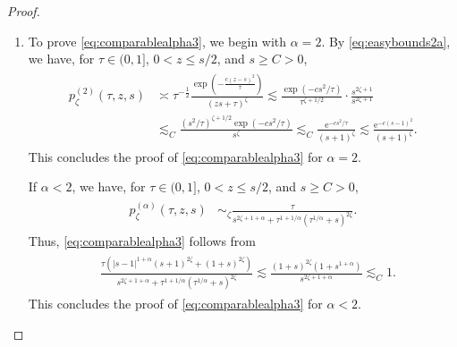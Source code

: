 \documentclass[12pt,reqno,a4paper]{amsart}
\theoremstyle{definition}
\theoremstyle{remark}
\numberwithin{equation}{section}
\newcommand{\1}{\mathbbm{1}}
\newcommand{\me}[1]{\mathrm{e}^{#1}}
\newcommand{\one}{\mathbf{1}}
\begin{document}
\begin{proof}
\begin{enumerate}
    \begin{align}
      \begin{split}
        p_\zeta^{(\alpha)}(\tau,z,s)
        & \lesssim \frac{\tau}{s^{2\zeta+1+\alpha} + \tau^{(1+\alpha)/\alpha}\cdot s^{2\zeta}} \\
        & \lesssim \frac{\tau}{s^{2\zeta+1+\alpha}}\one_{\{\tau<s^\alpha\}} + \frac{\tau}{\tau^{(1+\alpha)/\alpha}\cdot s^{2\zeta}}\one_{\{\tau>s^\alpha\}}
        \lesssim s^{-(2\zeta+1)}.
      \end{split}
    \end{align}
    This concludes the proof of \eqref{eq:comparablealpha2a}--\eqref{eq:comparablealpha2c} for $\alpha<2$.
    
    
    \smallskip
  \item To prove \eqref{eq:comparablealpha3}, we begin with $\alpha=2$. By \eqref{eq:easybounds2a}, we have, for $\tau\in(0,1]$, $0<z\leq s/2$, and $s\geq C>0$,
    \begin{align}
      \begin{split}
        p_\zeta^{(2)}(\tau,z,s)
        & \asymp \tau^{-\frac12}\frac{\exp\left(-\frac{c(z-s)^2}{\tau}\right)}{(zs+\tau)^{\zeta}}
          \lesssim \frac{\exp(-cs^2/\tau)}{\tau^{\zeta+1/2}} \cdot \frac{s^{2\zeta+1}}{s^{2\zeta+1}} \\
        & \lesssim_C \frac{(s^2/\tau)^{\zeta+1/2} \exp(-cs^2/\tau)}{s^{\zeta}}
          \lesssim_C \frac{\me{-cs^2/\tau}}{(s+1)^{\zeta}}
          \lesssim \frac{\me{-c(s-1)^2}}{(s+1)^{\zeta}}.
      \end{split}
    \end{align}
    This concludes the proof of \eqref{eq:comparablealpha3} for $\alpha=2$.
    
    If $\alpha<2$, we have, for $\tau\in(0,1]$, $0<z\leq s/2$, and $s\geq C>0$,
    \begin{align}
      \begin{split}
        p_\zeta^{(\alpha)}(\tau,z,s)
        & \sim_{\zeta} \frac{\tau}{s^{2\zeta+1+\alpha} + \tau^{1+1/\alpha}(\tau^{1/\alpha}+s)^{2\zeta}}.
      \end{split}
    \end{align}
    Thus, \eqref{eq:comparablealpha3} follows from
    \begin{align}
      \label{eq:comparablealpha3aux1}
      \begin{split}
        & \frac{\tau\left(|s-1|^{1+\alpha}(s+1)^{2\zeta} + (1+s)^{2\zeta}\right)}{s^{2\zeta+1+\alpha} + \tau^{1+1/\alpha}(\tau^{1/\alpha}+s)^{2\zeta}}
          \lesssim \frac{(1+s)^{2\zeta}(1 + s^{1+\alpha})}{s^{2\zeta+1+\alpha}}
          \lesssim_C 1.
      \end{split}
    \end{align}
    This concludes the proof of \eqref{eq:comparablealpha3} for $\alpha<2$.


\end{enumerate}
\end{proof}
\end{document}
